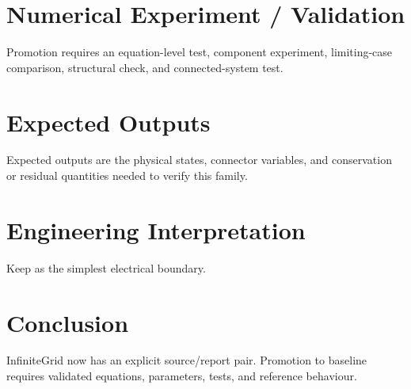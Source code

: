 \documentclass[10pt,a4paper]{article}
\begin{document}
\section{Numerical Experiment / Validation}Promotion requires an equation-level test, component experiment, limiting-case comparison, structural check, and connected-system test.
\section{Expected Outputs}Expected outputs are the physical states, connector variables, and conservation or residual quantities needed to verify this family.
\section{Engineering Interpretation}Keep as the simplest electrical boundary.
\section*{Conclusion}InfiniteGrid now has an explicit source/report pair. Promotion to baseline requires validated equations, parameters, tests, and reference behaviour.
\end{document}
